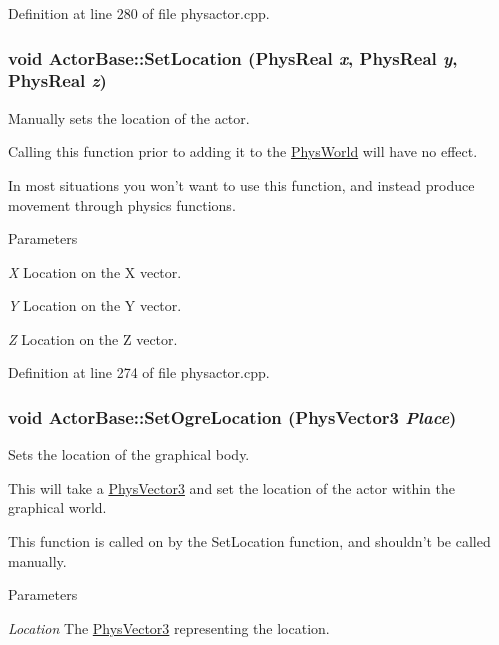 Definition at line 280 of file physactor.cpp.

\hypertarget{classActorBase_a34848d620c5d9d2796999edbdcb77c9a}{
\subsubsection[{SetLocation}]{\setlength{\rightskip}{0pt plus 5cm}void ActorBase::SetLocation (PhysReal {\em x}, \/  PhysReal {\em y}, \/  PhysReal {\em z})}}
\label{dd/d7b/classActorBase_a34848d620c5d9d2796999edbdcb77c9a}


Manually sets the location of the actor. 

Calling this function prior to adding it to the \hyperlink{classPhysWorld}{PhysWorld} will have no effect. \par
 In most situations you won't want to use this function, and instead produce movement through physics functions. 
\begin{DoxyParams}{Parameters}
\item[{\em X}]Location on the X vector. \item[{\em Y}]Location on the Y vector. \item[{\em Z}]Location on the Z vector. \end{DoxyParams}


Definition at line 274 of file physactor.cpp.

\hypertarget{classActorBase_a3140cc5c1c630efc1c04c20ada319b8b}{
\subsubsection[{SetOgreLocation}]{\setlength{\rightskip}{0pt plus 5cm}void ActorBase::SetOgreLocation ({\bf PhysVector3} {\em Place})}}
\label{dd/d7b/classActorBase_a3140cc5c1c630efc1c04c20ada319b8b}


Sets the location of the graphical body. 

This will take a \hyperlink{classPhysVector3}{PhysVector3} and set the location of the actor within the graphical world. \par
 This function is called on by the SetLocation function, and shouldn't be called manually. 
\begin{DoxyParams}{Parameters}
\item[{\em Location}]The \hyperlink{classPhysVector3}{PhysVector3} representing the location. \end{DoxyParams}


